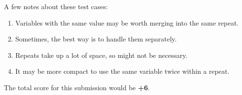 A few notes about these test cases:

\begin{enumerate}
    \item Variables with the same value may be worth merging into the same repeat.
    \item Sometimes, the best way is to handle them separately.
    \item Repeats take up a lot of space, so might not be necessary.
    \item It may be more compact to use the same variable twice within a repeat.
\end{enumerate}

The total score for this submission would be \textbf{+6}.